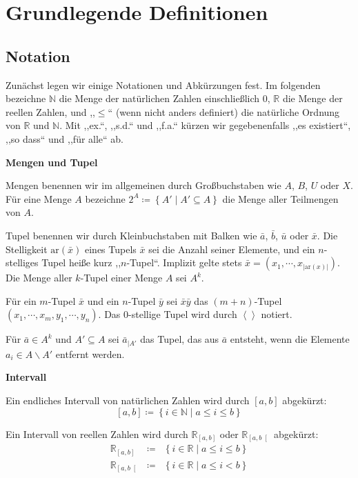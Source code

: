 
\chapter{Grundlegende Definitionen}

\section{Notation}

Zunächst legen wir einige Notationen und Abkürzungen fest. Im folgenden
bezeichne $\mathbb{N}$ die Menge der natürlichen Zahlen einschließlich
$0$, $\mathbb{R}$ die Menge der reellen Zahlen, und ,,$\leqslant$``
(wenn nicht anders definiert) die natürliche Ordnung von $\mathbb{R}$
und $\mathbb{N}$. Mit ,,ex.``, ,,s.d.`` und ,,f.a.`` kürzen
wir gegebenenfalls ,,es existiert``, ,,so dass`` und ,,für alle``
ab.
\begin{defn}
\textbf{\label{def:tupel}Mengen und Tupel}

Mengen benennen wir im allgemeinen durch Großbuchstaben wie $A$,
$B$, $U$ oder $X$. Für eine Menge $A$ bezeichne $2^{A}\coloneqq\left\{ A'\mid A'\subseteq A\right\} $
die Menge aller Teilmengen von $A$.

Tupel benennen wir durch Kleinbuchstaben mit Balken wie $\bar{a}$,
$\bar{b}$, $\bar{u}$ oder $\bar{x}$. Die Stelligkeit $\mathrm{ar}\left(\bar{x}\right)$
eines Tupels $\bar{x}$ sei die Anzahl seiner Elemente, und ein $n$-stelliges
Tupel heiße kurz ,,$n$-Tupel``. Implizit gelte stets $\bar{x}=\left(x_{1},\cdots,x_{\left|\mathrm{ar}\left(x\right)\right|}\right)$.
Die Menge aller $k$-Tupel einer Menge $A$ sei $A^{k}$.

Für ein $m$-Tupel $\bar{x}$ und ein $n$-Tupel $\bar{y}$ sei $\bar{x}\bar{y}$
das $\left(m+n\right)$-Tupel $\left(x_{1},\cdots,x_{m},y_{1},\cdots,y_{n}\right)$.
Das $0$-stellige Tupel wird durch $\left\langle \right\rangle $
notiert.

Für $\bar{a}\in A^{k}$ und $A'\subseteq A$ sei $\bar{a}_{\mid A'}$
das Tupel, das aus $\bar{a}$ entsteht, wenn die Elemente $a_{i}\in A\backslash A'$
entfernt werden.
\end{defn}
%
\begin{defn}
\textbf{Intervall}

Ein endliches Intervall von natürlichen Zahlen wird durch $\left[a,b\right]$
abgekürzt:
\[
\left[a,b\right]\coloneqq\left\{ i\in\mathbb{N}\mid a\leqslant i\leqslant b\right\} 
\]

Ein Intervall von reellen Zahlen wird durch $\mathbb{R}_{\left[a,b\right]}$
oder $\mathbb{R}_{\left[a,b\right[}$ abgekürzt: 
\begin{eqnarray*}
\mathbb{R}_{\left[a,b\right]} & \coloneqq & \left\{ i\in\mathbb{R}\mid a\leqslant i\leqslant b\right\} \\
\mathbb{R}_{\left[a,b\right[} & \coloneqq & \left\{ i\in\mathbb{R}\mid a\leqslant i<b\right\} 
\end{eqnarray*}
\end{defn}

